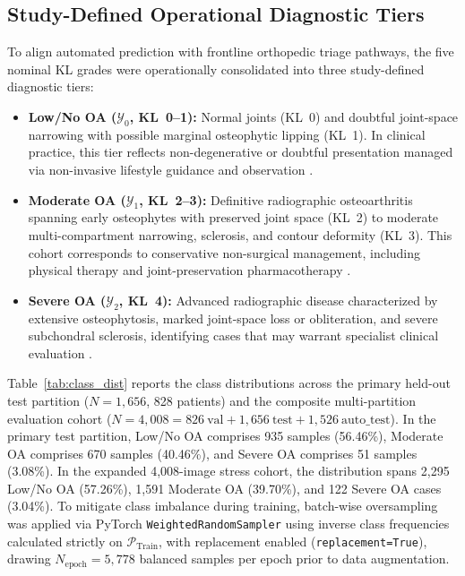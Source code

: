 \documentclass[10pt,journal]{IEEEtran}
\begin{document}
\subsection{Study-Defined Operational Diagnostic Tiers}
\label{subsec:class_remapping}

To align automated prediction with frontline orthopedic triage pathways, the five nominal KL grades were operationally consolidated into three study-defined diagnostic tiers:
\begin{itemize}[leftmargin=*]
\item \textbf{Low/No OA ($\mathcal{Y}_0$, KL~0--1):} Normal joints (KL~0) and doubtful joint-space narrowing with possible marginal osteophytic lipping (KL~1). In clinical practice, this tier reflects non-degenerative or doubtful presentation managed via non-invasive lifestyle guidance and observation \cite{zhang2010eular}.
\item \textbf{Moderate OA ($\mathcal{Y}_1$, KL~2--3):} Definitive radiographic osteoarthritis spanning early osteophytes with preserved joint space (KL~2) to moderate multi-compartment narrowing, sclerosis, and contour deformity (KL~3). This cohort corresponds to conservative non-surgical management, including physical therapy and joint-preservation pharmacotherapy \cite{zhang2010eular}.
\item \textbf{Severe OA ($\mathcal{Y}_2$, KL~4):} Advanced radiographic disease characterized by extensive osteophytosis, marked joint-space loss or obliteration, and severe subchondral sclerosis, identifying cases that may warrant specialist clinical evaluation \cite{zhang2010eular}.
\end{itemize}

Table~\ref{tab:class_dist} reports the class distributions across the primary held-out test partition ($N = 1{,}656$, 828 patients) and the composite multi-partition evaluation cohort ($N = 4{,}008 = 826\ \text{val} + 1{,}656\ \text{test} + 1{,}526\ \text{auto\_test}$). In the primary test partition, Low/No OA comprises 935 samples (56.46\%), Moderate OA comprises 670 samples (40.46\%), and Severe OA comprises 51 samples (3.08\%). In the expanded 4,008-image stress cohort, the distribution spans 2,295 Low/No OA (57.26\%), 1,591 Moderate OA (39.70\%), and 122 Severe OA cases (3.04\%). To mitigate class imbalance during training, batch-wise oversampling was applied via PyTorch \texttt{WeightedRandomSampler} using inverse class frequencies calculated strictly on $\mathcal{P}_{\text{Train}}$, with replacement enabled (\texttt{replacement=True}), drawing $N_{\text{epoch}} = 5{,}778$ balanced samples per epoch prior to data augmentation.
\end{document}
